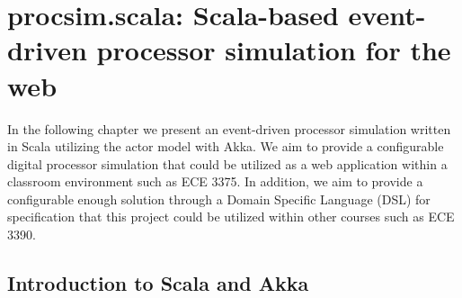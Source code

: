 \chapter{procsim.scala: Scala-based event-driven processor simulation for the web}
\label{ch:scala-akka}

\newcommand{\scalainline}[1]{\texttt{#1}}
\newcommand{\akkaActor}{\scalainline{Actor}}

In the following chapter we present an event-driven processor simulation written in Scala utilizing the actor model with Akka. We aim to provide a configurable digital processor simulation that could be utilized as a web application within a classroom environment such as ECE 3375. In addition, we aim to provide a configurable enough solution through a Domain Specific Language (DSL) for specification that this project could be utilized within other courses such as ECE 3390.

\section{Introduction to Scala and Akka}

